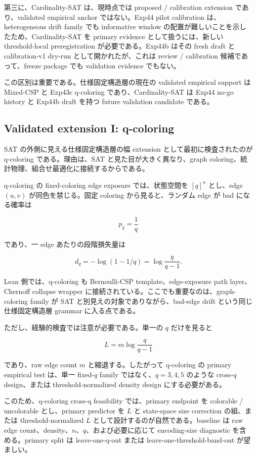 \documentclass[12pt,a4paper]{article}
\begin{document}
第三に、Cardinality-SAT は、現時点では proposed / calibration extension であり、validated empirical anchor ではない。Exp44 pilot calibration は、heterogeneous drift family でも informative window の配置が難しいことを示したため、Cardinality-SAT を primary evidence として扱うには、新しい threshold-local preregistration が必要である。Exp44b はその fresh draft と calibration-v1 dry-run として開かれたが、これは review / calibration 候補であって、freeze package でも validation evidence でもない。

この区別は重要である。仕様固定構造層の現在の validated empirical support は Mixed-CSP と Exp43c q-coloring であり、Cardinality-SAT は Exp44 no-go history と Exp44b draft を持つ future validation candidate である。

\subsection{Validated extension I: q-coloring}\label{validated-extension-i-q-coloring}

SAT の外側に見える仕様固定構造層の幅 extension として最初に検査されたのが q-coloring である。理由は、SAT と見た目が大きく異なり、graph coloring、統計物理、組合せ最適化に接続するからである。

q-coloring の fixed-coloring edge exposure では、状態空間を \([q]^n\) とし、edge \((u,v)\) が同色を禁じる。固定 coloring から見ると、ランダム edge が bad になる確率は

\[
p_{q}=\frac{1}{q}
\]

であり、一 edge あたりの段階損失量は

\[
d_{q} = -\log(1-1/q) = \log\frac{q}{q-1}.
\]

Lean 側では、q-coloring も Bernoulli-CSP template、edge-exposure path layer、Chernoff collapse wrapper に接続されている。ここでも重要なのは、graph-coloring family が SAT と別見えの対象でありながら、bad-edge drift という同じ 仕様固定構造層 grammar に入る点である。

ただし、経験的検査では注意が必要である。単一の \(q\) だけを見ると

\[
L=m\log\frac{q}{q-1}
\]

であり、raw edge count \(m\) と縮退する。したがって q-coloring の primary empirical test は、単一 fixed-\(q\) family ではなく、\(q=3,4,5\) のような cross-\(q\) design、または threshold-normalized density design にする必要がある。

このため、q-coloring cross-q feasibility では、primary endpoint を colorable / uncolorable とし、primary predictor を \(L\) と state-space size correction の組、または threshold-normalized \(L\) として設計するのが自然である。baseline は raw edge count、density、\(n\)、\(q\)、および必要に応じて encoding-size diagnostic を含める。primary split は leave-one-q-out または leave-one-threshold-band-out が望ましい。
\end{document}
